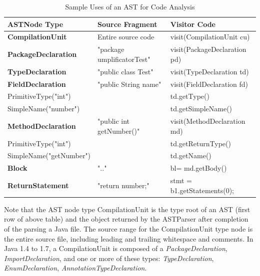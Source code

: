 \newcommand*{\MyIndent}{\hspace*{0.4cm}}%
\begin{table}[h]
\caption{Sample Uses of an AST for Code Analysis}
\label{table:astanalysis}
\begin{tabularx}{\textwidth}{l|YY}
\toprule
{}
\textbf{ASTNode Type} & \textbf{Source Fragment}  & \textbf{Visitor Code}  \\ \hline	
\textbf{CompilationUnit} &  Entire source code & visit(CompilationUnit cu) \\ \hline
\MyIndent \textbf{PackageDeclaration} & "package umplificatorTest" & visit(PackageDeclaration pd) \\ \hline
\MyIndent \textbf{TypeDeclaration} &  "public class Test" & visit(TypeDeclaration td) \\ \hline
\MyIndent \MyIndent \textbf{FieldDeclaration} &  "public String name" & visit(FieldDeclaration fd) \\ 
\MyIndent \MyIndent \MyIndent PrimitiveType("int") &   & \MyIndent td.getType() \\ 
\MyIndent \MyIndent \MyIndent SimpleName("number") &   & \MyIndent td.getSimpleName() \\ \hline
\MyIndent \MyIndent \textbf{MethodDeclaration} &  "public int getNumber()" & visit(MethodDeclaration md) \\ 
\MyIndent \MyIndent \MyIndent PrimitiveType("int") &   & \MyIndent td.getReturnType() \\ 
\MyIndent \MyIndent \MyIndent SimpleName("getNumber") &   & \MyIndent td.getName() \\ \hline
\MyIndent \MyIndent \MyIndent \MyIndent \textbf{Block} & "{..}"& \MyIndent bl=  md.getBody() \\ 
\MyIndent \MyIndent \MyIndent  \MyIndent \MyIndent \textbf{ReturnStatement} &  "return number;" & stmt = b1.getStatements(0); \\ \hline
\end{tabularx}
\end{table}

Note that the AST node type CompilationUnit is the type root of an AST (first row of above table) and the object returned by the ASTParser after completion of the parsing a Java file. The source range for the CompilationUnit type node is the entire source file, including leading and trailing whitespace and comments. In Java 1.4 to 1.7, a CompilationUnit is composed of 
a \textit{PackageDeclaration}, \textit{ImportDeclaration}, and one or more of these types:  \textit{TypeDeclaration}, \textit{EnumDeclaration}, \textit{AnnotationTypeDeclaration}. 

